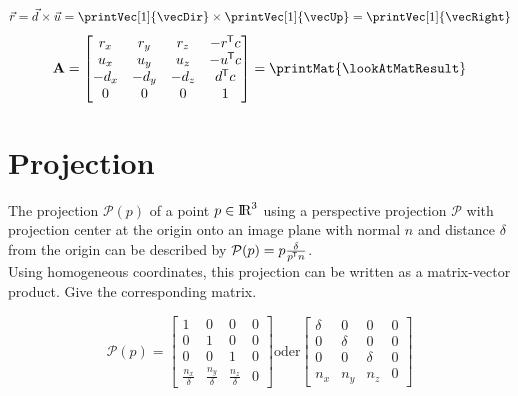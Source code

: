 \documentclass[10pt, a4paper]{article}
\begin{document}
\crossVec[vecRight]{\vecDir}{\vecUp}
\begin{align*}
    \vec{r} = \vec{d}\times \vec{u}
    = \printVec[1]{\vecDir} \times \printVec[1]{\vecUp}
    = \printVec[1]{\vecRight}
\end{align*}
\newLookAtMat{\vecRight}{\vecUp}{\vecDir}{\vecCamera}
\[
    \mathbf{A} =
    \begin{bmatrix}
        r_x & r_y & r_z & \trans{-r} c\\
        u_x & u_y & u_z & \trans{-u} c\\
        -d_x & -d_y & -d_z & \trans{d} c\\
        0 & 0 & 0 & 1\\
    \end{bmatrix}
    = \printMat{\lookAtMatResult}
\]

\section{Projection}


The projection \(\mathcal{P}(p)\) of a point \(p \in \textrm{I\!R}^{3}\) using a perspective projection \(\mathcal{P}\) with projection center
at the origin onto an image plane with normal \(n\) and distance \(\delta\) from the origin can be described by \(\mathcal{P}(p) = p \frac{\delta}{{p}\mkern-1mu^{\mathsf{T}}n}\).\\
Using homogeneous coordinates, this projection can be written as a matrix-vector product.
Give the corresponding matrix.

\[
    \mathcal{P}(p) = \begin{bmatrix}
        1 & 0 & 0 & 0 \\
        0 & 1 & 0 & 0 \\
        0 & 0 & 1 & 0\\
        \frac{n_x}{\delta} & \frac{n_y}{\delta} & \frac{n_z}{\delta} & 0
    \end{bmatrix}
    \text{oder}
    \begin{bmatrix}
        \delta & 0 & 0 & 0 \\
        0 & \delta & 0 & 0 \\
        0 & 0 & \delta & 0\\
        n_x & n_y & n_z & 0
    \end{bmatrix}
\]
\end{document}
